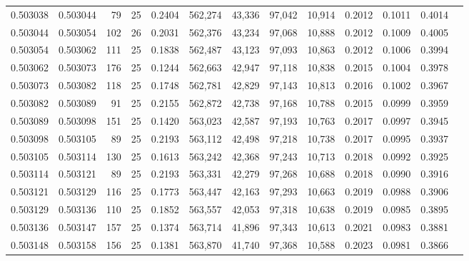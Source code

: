 \begin{tabular}{rrrrrrrrrrrrr}
0.503038 & 0.503044 &  79 &  25 &                                     0.2404 & 562,274 &  43,336 &  97,042 &  10,914 & 0.2012 & 0.1011 & 0.4014 \\
0.503044 & 0.503054 & 102 &  26 &                                     0.2031 & 562,376 &  43,234 &  97,068 &  10,888 & 0.2012 & 0.1009 & 0.4005 \\
0.503054 & 0.503062 & 111 &  25 &                                     0.1838 & 562,487 &  43,123 &  97,093 &  10,863 & 0.2012 & 0.1006 & 0.3994 \\
0.503062 & 0.503073 & 176 &  25 &                                     0.1244 & 562,663 &  42,947 &  97,118 &  10,838 & 0.2015 & 0.1004 & 0.3978 \\
0.503073 & 0.503082 & 118 &  25 &                                     0.1748 & 562,781 &  42,829 &  97,143 &  10,813 & 0.2016 & 0.1002 & 0.3967 \\
0.503082 & 0.503089 &  91 &  25 &                                     0.2155 & 562,872 &  42,738 &  97,168 &  10,788 & 0.2015 & 0.0999 & 0.3959 \\
0.503089 & 0.503098 & 151 &  25 &                                     0.1420 & 563,023 &  42,587 &  97,193 &  10,763 & 0.2017 & 0.0997 & 0.3945 \\
0.503098 & 0.503105 &  89 &  25 &                                     0.2193 & 563,112 &  42,498 &  97,218 &  10,738 & 0.2017 & 0.0995 & 0.3937 \\
0.503105 & 0.503114 & 130 &  25 &                                     0.1613 & 563,242 &  42,368 &  97,243 &  10,713 & 0.2018 & 0.0992 & 0.3925 \\
0.503114 & 0.503121 &  89 &  25 &                                     0.2193 & 563,331 &  42,279 &  97,268 &  10,688 & 0.2018 & 0.0990 & 0.3916 \\
0.503121 & 0.503129 & 116 &  25 &                                     0.1773 & 563,447 &  42,163 &  97,293 &  10,663 & 0.2019 & 0.0988 & 0.3906 \\
0.503129 & 0.503136 & 110 &  25 &                                     0.1852 & 563,557 &  42,053 &  97,318 &  10,638 & 0.2019 & 0.0985 & 0.3895 \\
0.503136 & 0.503147 & 157 &  25 &                                     0.1374 & 563,714 &  41,896 &  97,343 &  10,613 & 0.2021 & 0.0983 & 0.3881 \\
0.503148 & 0.503158 & 156 &  25 &                                     0.1381 & 563,870 &  41,740 &  97,368 &  10,588 & 0.2023 & 0.0981 & 0.3866 \\

\end{tabular}
